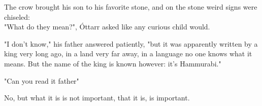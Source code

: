 The crow brought his son to his favorite stone, and on the stone weird signs were chiseled:\\


  
"What do they mean?", Óttarr asked like any curious child would.

"I don't know," his father answered patiently, "but it was apparently written by a king very long ago, in a land very far away, in a language no one knows what it means. But the name of the king is known however: it's Hammurabi." 

"Can you read it father"

No, but what it is is not important, that it is, is important. 

